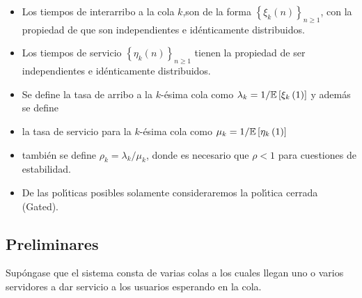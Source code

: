 \begin{itemize}
\item Los tiempos de interarribo a la cola $k$,son de la forma
$\left\{\xi_{k}\left(n\right)\right\}_{n\geq1}$, con la propiedad
de que son independientes e id{\'e}nticamente distribuidos.

\item Los tiempos de servicio
$\left\{\eta_{k}\left(n\right)\right\}_{n\geq1}$ tienen la
propiedad de ser independientes e id{\'e}nticamente distribuidos.

\item Se define la tasa de arribo a la $k$-{\'e}sima cola como
$\lambda_{k}=1/\mathbb{E}\left[\xi_{k}\left(1\right)\right]$ y
adem{\'a}s se define

\item la tasa de servicio para la $k$-{\'e}sima cola como
$\mu_{k}=1/\mathbb{E}\left[\eta_{k}\left(1\right)\right]$

\item tambi{\'e}n se define $\rho_{k}=\lambda_{k}/\mu_{k}$, donde
es necesario que $\rho<1$ para cuestiones de estabilidad.

\item De las pol{\'\i}ticas posibles solamente consideraremos la
pol{\'\i}tica cerrada (Gated).
\end{itemize}

\subsection{Preliminares}



Sup\'ongase que el sistema consta de varias colas a los cuales
llegan uno o varios servidores a dar servicio a los usuarios
esperando en la cola.\\


